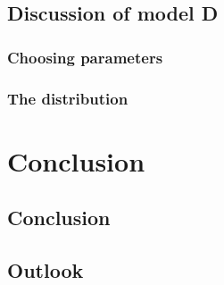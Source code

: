 \documentclass[a4paper, 10pt]{article}
\begin{document}
\subsection{Discussion of model D}
\subsubsection{Choosing parameters}

\subsubsection{The distribution}



\section{Conclusion}
\subsection{Conclusion}
\subsection{Outlook}
\end{document}
